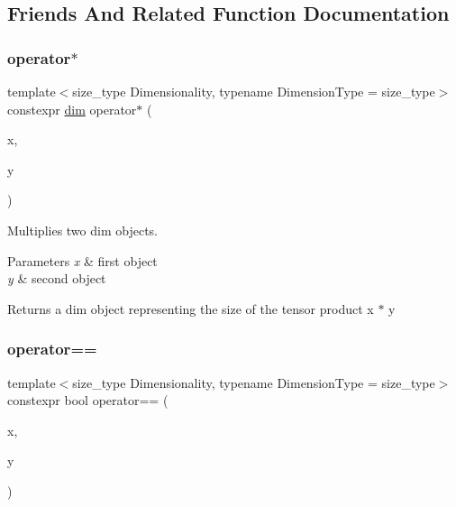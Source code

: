 \subsection{Friends And Related Function Documentation}
\mbox{\label{structgko_1_1dim_a27d25e410396817b4ceafbae3d5df5c8}} 
\subsubsection{\texorpdfstring{operator$\ast$}{operator*}}
{\footnotesize\ttfamily template$<$size\+\_\+type Dimensionality, typename Dimension\+Type = size\+\_\+type$>$ \\
constexpr \hyperlink{structgko_1_1dim}{dim} operator$\ast$ (\begin{DoxyParamCaption}\item[{const \hyperlink{structgko_1_1dim}{dim}$<$ Dimensionality, Dimension\+Type $>$ \&}]{x,  }\item[{const \hyperlink{structgko_1_1dim}{dim}$<$ Dimensionality, Dimension\+Type $>$ \&}]{y }\end{DoxyParamCaption})\hspace{0.3cm}{\ttfamily [friend]}}



Multiplies two dim objects. 


\begin{DoxyParams}{Parameters}
{\em x} & first object \\
\hline
{\em y} & second object\\
\hline
\end{DoxyParams}
\begin{DoxyReturn}{Returns}
a dim object representing the size of the tensor product {\ttfamily x $\ast$ y} 
\end{DoxyReturn}
\mbox{\label{structgko_1_1dim_a5e2c1e99f1c12540aac8489127c5dfb6}} 
\subsubsection{\texorpdfstring{operator==}{operator==}}
{\footnotesize\ttfamily template$<$size\+\_\+type Dimensionality, typename Dimension\+Type = size\+\_\+type$>$ \\
constexpr bool operator== (\begin{DoxyParamCaption}\item[{const \hyperlink{structgko_1_1dim}{dim}$<$ Dimensionality, Dimension\+Type $>$ \&}]{x,  }\item[{const \hyperlink{structgko_1_1dim}{dim}$<$ Dimensionality, Dimension\+Type $>$ \&}]{y }\end{DoxyParamCaption})\hspace{0.3cm}{\ttfamily [friend]}}



